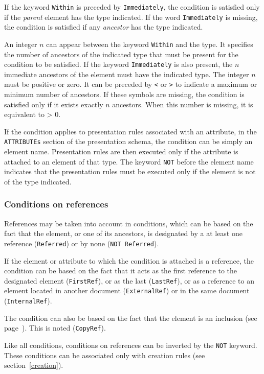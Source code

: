 If the keyword
{\tt Within} is preceded by {\tt Immediately}, the condition is
satisfied only if the {\em parent} element has the type indicated.
If the word {\tt Immediately} is missing, the condition is satisfied
if any {\em ancestor} has the type indicated.

An integer $n$ can appear between the keyword {\tt Within} and the
type.  It specifies the number of ancestors of the indicated type that must
be present for the condition to be satisfied.  If the keyword
{\tt Immediately} is also present, the $n$ immediate ancestors of the
element must have the indicated type.  The integer $n$ must be positive
or zero.  It can be preceded by {\tt <} or {\tt >} to indicate a maximum
or minimum number of ancestors.  If these symbols are missing, the
condition is satisfied only if it exists exactly $n$ ancestors.  When
this number is missing, it is equivalent to > 0.

If the condition applies to presentation rules associated with an attribute,
in the {\tt ATTRIBUTEs} section of the presentation schema, the condition
can be simply an element name. Presentation rules are then executed only
if the attribute is attached to an element of that type. The keyword
{\tt NOT} before the element name indicates that the presentation rules
must be executed only if the element is not of the type indicated.

\subsubsection{Conditions on references}

References may be taken into account in conditions, which can be based
on the fact that the element, or one of its ancestors, is designated
by a at least one reference ({\tt Referred}) or by none ({\tt NOT
Referred}).

If the element or attribute to which the condition is
attached is a reference, the condition can be based on the fact that
it acts as the first reference to the designated element ({\tt FirstRef}),
or as the last ({\tt LastRef}), or as a reference to an element located in
another document ({\tt ExternalRef}) or in the same document
({\tt InternalRef}).

The condition can also be based on the fact that the element is an
inclusion (see page~\pageref{inclusion}).  This is noted ({\tt CopyRef}).

Like all conditions, conditions
on references can be inverted by the {\tt NOT} keyword.
These conditions can be associated only with creation rules
(see section~\ref{creation}).

